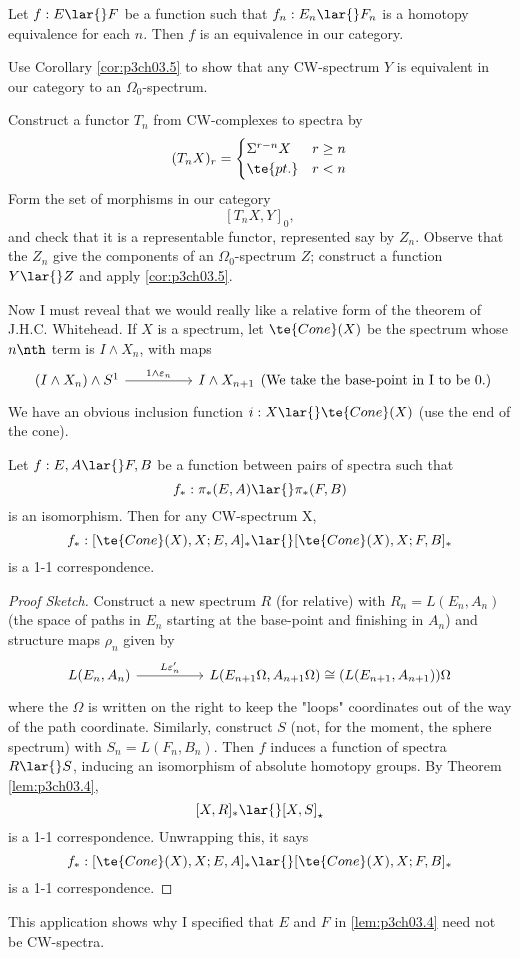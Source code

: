 \documentclass[../main]{subfiles}
\begin{document}
\begin{examples}
Let $f: E\lar{} F$ be a function such that $f_n: E_n\lar{} F_n$ is a
homotopy equivalence for each $n$. Then $f$ is an equivalence in our
category. 
\end{examples}
\begin{exercise}
Use Corollary \ref{cor:p3ch03.5} to show that any CW-spectrum $Y$ is equivalent in our category to an $\Omega_0$-spectrum.
\end{exercise}
\begin{hint}
Construct a functor $T_n$ from CW-complexes to spectra by \[(T_nX)_r =\begin{cases}\Sigma^{r-n}X & r\geq n\\ \te{pt.} & r<n\end{cases}\]
Form the set of morphisms in our category \[[T_nX,Y]_0,\] and check that it is a representable functor, represented say by $Z_n$. Observe that the $Z_n$ give the components of an $\Omega_0$-spectrum $Z$; construct a function $Y\lar{}Z$ and apply \ref{cor:p3ch03.5}.
\end{hint}

Now I must reveal that we would really like a relative form of the
theorem of J.H.C. Whitehead. If $X$ is a spectrum, let $\te{Cone}(X)$ be
the spectrum whose $n\nth$ term is $I\wedge X_n$, with maps
\[\begin{tikzcd}
(I\wedge X_n)\wedge S^1 \arrow[rr, "1\wedge \varepsilon_n"] &  & I\wedge X_{n+1} 
\end{tikzcd} \text{(We take the base-point in I to be 0.)}\] 
We have an obvious inclusion function $i:X\lar{} \te{Cone}(X)$ (use the end of the cone).
\begin{customthm}{3.6}\label{thm:p3ch03.6}
Let $f:E,A\lar{} F,B$ be a function between pairs of spectra such that \[f_\ast:\pi_\ast(E,A)\lar{} \pi_\ast (F,B)\] is an isomorphism. Then for any CW-spectrum X, \[f_\ast:[\te{Cone}(X),X; E,A]_\ast \lar{}[\te{Cone}(X),X; F,B]_\ast\]
is a 1-1 correspondence.
\end{customthm}
\begin{proof}[Proof Sketch]
Construct a new spectrum $R$ (for relative) with $R_n=L(E_n,A_n)$ (the space of paths in $E_n$ starting at the base-point and finishing in $A_n$) and structure maps $\rho_n$ given by 
\[\begin{tikzcd}
{L(E_n,A_n)} \arrow[rr, "L\varepsilon'_n"] &  & {L(E_{n+1} \Omega, A_{n+1} \Omega)\cong (L(E_{n+1},A_{n+1}))\Omega}
\end{tikzcd}  \]
where the $\Omega$ is written on the right to keep the "loops" coordinates out of the way of the path coordinate. Similarly, construct $S$ (not, for the moment, the sphere spectrum) with $S_n=L(F_n,B_n)$. Then $f$ induces a function of spectra $R\lar{} S$, inducing an isomorphism of absolute homotopy groups. By Theorem \ref{lem:p3ch03.4}, 
\[[X,R]_\ast \lar{} [X,S]_\star \]
is a 1-1 correspondence. Unwrapping this, it says \[f_\ast:[\te{Cone}(X),X; E,A]_\ast \lar{}[\te{Cone}(X),X; F,B]_\ast\]
is a 1-1 correspondence.
\end{proof}
This application shows why I specified that $E$ and $F$ in \ref{lem:p3ch03.4} need
not be CW-spectra. 
\end{document}
